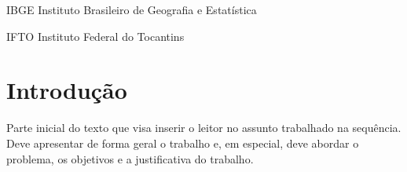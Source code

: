 \documentclass{ifto-tex}
\begin{document}

\frenchspacing 

\pretextual

\imprimircapa

\imprimirfolhaderosto

\listoffigures*
\cleardoublepage


\listoftables*
\cleardoublepage

\begin{siglas}
	\item[IBGE]{Instituto Brasileiro de Geografia e Estatística}
	\item[IFTO]{Instituto Federal do Tocantins}
\end{siglas}


\tableofcontents*
\cleardoublepage


\textual

\chapter{Introdução}

	Parte inicial do texto que visa inserir o leitor no assunto trabalhado na sequência. Deve apresentar de forma geral o trabalho e, em especial, deve abordar o problema, os objetivos e a justificativa do trabalho.
\end{document}
